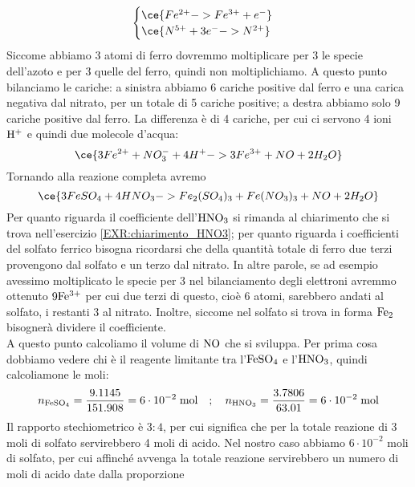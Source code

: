 \begin{soluzione}
\begin{equation*}
\begin{cases}
            \ce{Fe^{2+} -> Fe^{3+} + e^-}\\
            \ce{N^{5+} +3e^- -> N^{2+}}
        \end{cases}
    \end{equation*}
    Siccome abbiamo 3 atomi di ferro dovremmo moltiplicare per 3 le specie dell'azoto e per 3 quelle del ferro, quindi non moltiplichiamo. A questo punto bilanciamo le cariche: a sinistra abbiamo 6 cariche positive dal ferro e una carica negativa dal nitrato, per un totale di 5 cariche positive; a destra abbiamo solo 9 cariche positive dal ferro. La differenza è di 4 cariche, per cui ci servono 4 ioni $\rm H^+$ e quindi due molecole d'acqua:
    \begin{equation*}
        \ce{3Fe^{2+} + NO_3^- + 4H^+ -> 3Fe^{3+} + NO + 2H_2O}
    \end{equation*}
    Tornando alla reazione completa avremo
    \begin{equation*}
        \ce{3FeSO_4 + 4HNO_3 -> Fe_2(SO_4)_3 + Fe(NO_3)_3 + NO + 2H_2O}
    \end{equation*}
    Per quanto riguarda il coefficiente dell'$\rm HNO_3$ si rimanda al chiarimento che si trova nell'esercizio \ref{EXR:chiarimento_HNO3}; per quanto riguarda i coefficienti del solfato ferrico bisogna ricordarsi che della quantità totale di ferro due terzi provengono dal solfato e un terzo dal nitrato. In altre parole, se ad esempio avessimo moltiplicato le specie per 3 nel bilanciamento degli elettroni avremmo ottenuto $\rm 9Fe^{3+}$ per cui due terzi di questo, cioè 6 atomi, sarebbero andati al solfato, i restanti 3 al nitrato. Inoltre, siccome nel solfato si trova in forma $\rm Fe_2$ bisognerà dividere il coefficiente.\\
    A questo punto calcoliamo il volume di $\rm NO$ che si sviluppa. Per prima cosa dobbiamo vedere chi è il reagente limitante tra l'$\rm FeSO_4$ e l'$\rm HNO_3$, quindi calcoliamone le moli:
    \begin{equation*}
        n_{\rm FeSO_4}=\frac{9.1145}{151.908}
        =6 \cdot 10^{-2} \; \text{mol}
        \quad;\quad
        n_{\rm HNO_3}=\frac{3.7806}{63.01}
        =6 \cdot 10^{-2} \; \rm mol
    \end{equation*}
    Il rapporto stechiometrico è $3:4$, per cui significa che per la totale reazione di 3 moli di solfato servirebbero 4 moli di acido. Nel nostro caso abbiamo $6 \cdot 10^{-2}$ moli di solfato, per cui affinché avvenga la totale reazione servirebbero un numero di moli di acido date dalla proporzione
    \begin{equation*}

\end{equation*}
\end{soluzione}
